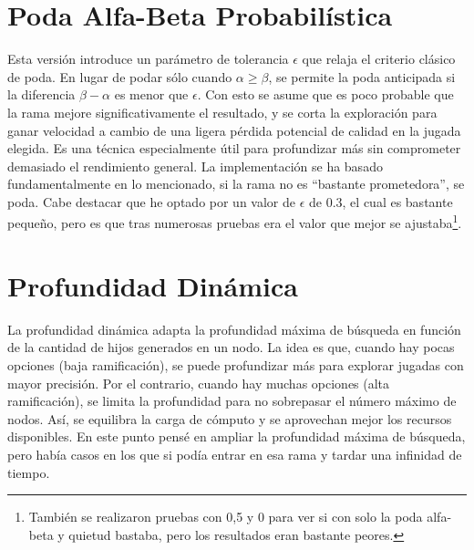 \section*{Poda Alfa-Beta Probabilística}
Esta versión introduce un parámetro de tolerancia $\epsilon$ que relaja el criterio clásico de poda. En lugar de podar sólo cuando $\alpha \geq \beta$, se permite la poda anticipada si la diferencia $\beta - \alpha$ es menor que $\epsilon$. Con esto se asume que es poco probable que la rama mejore significativamente el resultado, y se corta la exploración para ganar velocidad a cambio de una ligera pérdida potencial de calidad en la jugada elegida. Es una técnica especialmente útil para profundizar más sin comprometer demasiado el rendimiento general. La implementación se ha basado fundamentalmente en lo mencionado, si la rama no es ``bastante prometedora'', se poda. Cabe destacar que he optado por un valor de $\epsilon$ de 0.3, el cual es bastante pequeño, pero es que tras numerosas pruebas era el valor que mejor se ajustaba\footnote{También se realizaron pruebas con 0,5 y 0 para ver si con solo la poda alfa-beta y quietud bastaba, pero los resultados eran bastante peores.}.

\section*{Profundidad Dinámica}
La profundidad dinámica adapta la profundidad máxima de búsqueda en función de la cantidad de hijos generados en un nodo. La idea es que, cuando hay pocas opciones (baja ramificación), se puede profundizar más para explorar jugadas con mayor precisión. Por el contrario, cuando hay muchas opciones (alta ramificación), se limita la profundidad para no sobrepasar el número máximo de nodos. Así, se equilibra la carga de cómputo y se aprovechan mejor los recursos disponibles. En este punto pensé en ampliar la profundidad máxima de búsqueda, pero había casos en los que si podía entrar en esa rama y tardar una infinidad de tiempo.

